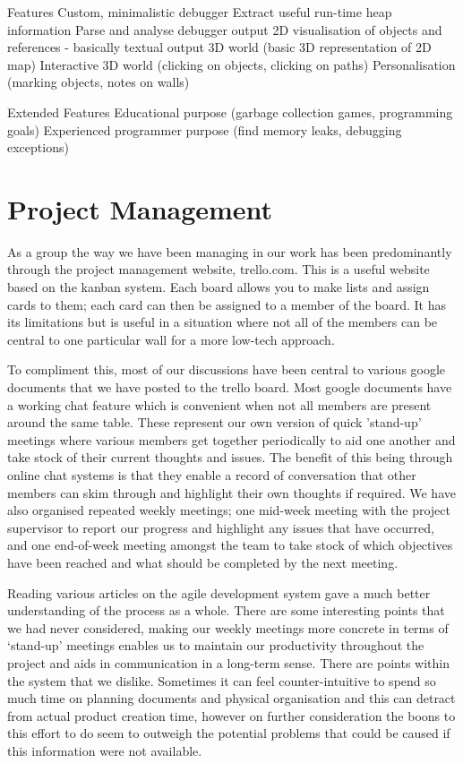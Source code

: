 \documentclass[10pt, a4paper]{article}
\begin{document}
Features
Custom, minimalistic debugger
Extract useful run-time heap information
Parse and analyse debugger output 
2D visualisation of objects and references - basically textual output
3D world (basic 3D representation of 2D map)
Interactive 3D world (clicking on objects, clicking on paths)
Personalisation (marking objects, notes on walls)

Extended Features
Educational purpose (garbage collection games, programming goals)
Experienced programmer purpose (find memory leaks, debugging exceptions)

\section{Project Management}

As a group the way we have been managing in our work has been predominantly through the project management website, trello.com. This is a useful website based on the kanban system. Each board allows you to make lists and assign cards to them; each card can then be assigned to a member of the board. It has its limitations but is useful in a situation where not all of the members can be central to one particular wall for a more low-tech approach.

To compliment this, most of our discussions have been central to various google documents that we have posted to the trello board. Most google documents have a working chat feature which is convenient when not all members are present around the same table. These represent our own version of quick 'stand-up' meetings where various members get together periodically to aid one another and take stock of their current thoughts and issues. The benefit of this being through online chat systems is that they enable a record of conversation that other members can skim through and highlight their own thoughts if required. We have also organised repeated weekly meetings; one mid-week meeting with the project supervisor to report our progress and highlight any issues that have occurred, and one end-of-week meeting amongst the team to take stock of which objectives have been reached and what should be completed by the next meeting. 

Reading various articles on the agile development system gave a much better understanding of the process as a whole. There are some interesting points that we had never considered, making our weekly meetings more concrete in terms of ‘stand-up’ meetings enables us to maintain our productivity throughout the project and aids in communication in a long-term sense. There are points within the system that we dislike. Sometimes it can feel counter-intuitive to spend so much time on planning documents and physical organisation and this can detract from actual product creation time, however on further consideration the boons to this effort to do seem to outweigh the potential problems that could be caused if this information were not available.
\end{document}
